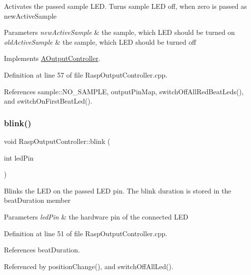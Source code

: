 Activates the passed sample L\+ED. Turns sample L\+ED off, when zero is passed as new\+Active\+Sample 
\begin{DoxyParams}{Parameters}
{\em new\+Active\+Sample} & the sample, which L\+ED should be turned on \\
\hline
{\em old\+Active\+Sample} & the sample, which L\+ED should be turned off \\
\hline
\end{DoxyParams}


Implements \hyperlink{class_a_output_controller_ac2b87aa6291c38cc65185bf6a37ae300}{A\+Output\+Controller}.



Definition at line 57 of file Rasp\+Output\+Controller.\+cpp.



References sample\+::\+N\+O\+\_\+\+S\+A\+M\+P\+LE, output\+Pin\+Map, switch\+Off\+All\+Red\+Beat\+Leds(), and switch\+On\+First\+Beat\+Led().

\mbox{\label{class_rasp_output_controller_a23987d33142c3c09abf8126773f32d99}} 
\subsubsection{\texorpdfstring{blink()}{blink()}}
{\footnotesize\ttfamily void Rasp\+Output\+Controller\+::blink (\begin{DoxyParamCaption}\item[{int}]{led\+Pin }\end{DoxyParamCaption})}

Blinks the L\+ED on the passed L\+ED pin. The blink duration is stored in the beat\+Duration member 
\begin{DoxyParams}{Parameters}
{\em led\+Pin} & the hardware pin of the connected L\+ED \\
\hline
\end{DoxyParams}


Definition at line 51 of file Rasp\+Output\+Controller.\+cpp.



References beat\+Duration.



Referenced by position\+Change(), and switch\+Off\+All\+Led().

\mbox{\label{class_rasp_output_controller_a1172c2966777bbcee89cbe4e6de027d5}} 
